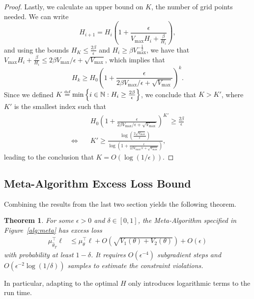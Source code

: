 \documentclass[11pt]{article}
\newtheorem{theorem}{Theorem}
\newcommand{\df}{\stackrel{\mbox{\rm\tiny def}}{=}}
\begin{document}
\begin{proof}
Lastly, we calculate an upper bound on $K$, the number of grid points needed. We can write
\[
  H_{i+1} = H_i\left( 1 +  \frac{\epsilon} {V_{\max}H_i +\frac{\beta }{H_i}} \right),
\]
and using the bounds
$H_K \leq  \frac{2\beta}{\epsilon}$ and $H_i \geq \beta V_{\max}^{-\frac12}$, we have that
$V_{\max}H_i +\frac{\beta }{H_i} \leq 2\beta V_{\max}/\epsilon +\sqrt{V_{\max}}$, which implies that
\[
  H_k \geq H_0 \left( 1 +  \frac{\epsilon}{ 2\beta V_{\max}/\epsilon +\sqrt{V_{\max}}}\right)^k.
\]
Since we defined $K \df \min\left\{i\in\nat : H_i \geq \frac{2\beta}{\epsilon}\right\}$, we conclude that $K > K'$, where $K'$ is the smallest index such that 
\begin{align*}
  &H_0 \left( 1 +  \frac{\epsilon}{ 2\beta V_{\max}/\epsilon +\sqrt{V_{\max}}}\right)^{K'}
  \geq \frac{2\beta}{\epsilon}\\
    \Leftrightarrow \quad&
                     K' 
                           \geq
                           \frac{\log\left(\frac{2\sqrt{V_{\max}}}{\epsilon}\right)}{\log \left( 1 +  \frac{\epsilon}{ 2\beta V_{\max}/\epsilon +\sqrt{V_{\max}}}\right)},                           
  \end{align*}
  leading to the conclusion that $K = O(\log(1/\epsilon))$.
\end{proof}

\subsection{Meta-Algorithm Excess Loss Bound}
Combining the results from the last two section yields the following theorem.
\begin{theorem}
  \label{thm:H_opt_average_cost}
  For some $\epsilon>0$ and $\delta \in [0,1]$, the Meta-Algorithm specified in Figure~\ref{alg:meta} has excess loss
\begin{align}
  \mu_{\widehat\theta_T}^\top \ell
  &\leq
    \mu_{\theta}^\top \ell + O\left(\sqrt{V_1(\theta)+V_2(\theta)}\right)
    +O(\epsilon)
\end{align}
with probability at least $1-\delta$. It requires  $O\left(\epsilon^{-4}\right)$ subgradient steps and $O\left(\epsilon^{-2}\log(1/\delta)\right)$ samples to estimate the constraint violations.
\end{theorem}
In particular, adapting to the optimal $H$ only introduces logarithmic terms to the run time.

\end{document}
